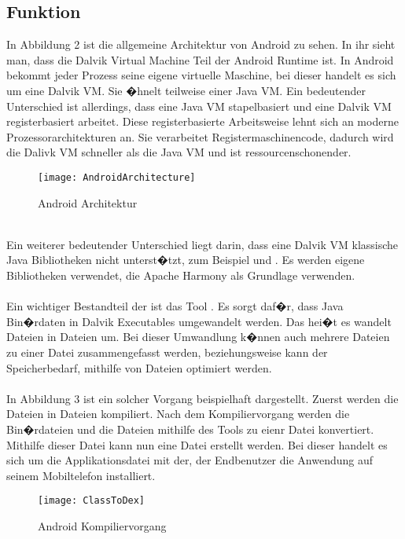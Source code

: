 \documentclass[11pt,conference,a4paper]{IEEEtran}
\begin{document}
\subsection{Funktion}
In Abbildung 2 ist die allgemeine Architektur von Android zu sehen. In ihr sieht man, dass die Dalvik Virtual Machine Teil der Android Runtime ist. In Android bekommt jeder Prozess seine eigene virtuelle Maschine, bei dieser handelt es sich um eine Dalvik VM. Sie �hnelt teilweise einer Java VM. Ein bedeutender Unterschied ist allerdings, dass eine Java VM stapelbasiert und eine Dalvik VM registerbasiert arbeitet. Diese registerbasierte Arbeitsweise lehnt sich an moderne Prozessorarchitekturen an. Sie verarbeitet Registermaschinencode, dadurch wird die Dalivk VM schneller als die Java VM und ist ressourcenschonender.
\\
\begin{figure*}
\centering
\texttt{[image: AndroidArchitecture]}
\caption{Android Architektur\cite{1}}
\label{fig:AndroidArchitecture}
\end{figure*}
\\
Ein weiterer bedeutender Unterschied liegt darin, dass eine Dalvik VM klassische Java Bibliotheken nicht unterst�tzt, zum Beispiel  und . Es werden eigene Bibliotheken verwendet, die Apache Harmony als Grundlage verwenden.
\\
\\
Ein wichtiger Bestandteil der  ist das Tool . Es sorgt daf�r, dass Java Bin�rdaten in Dalvik Executables umgewandelt werden. Das hei�t es wandelt  Dateien in  Dateien um. Bei dieser Umwandlung k�nnen auch mehrere  Dateien zu einer  Datei zusammengefasst werden, beziehungsweise kann der Speicherbedarf, mithilfe von  Dateien optimiert werden. 
\\
\\
In Abbildung 3 ist ein solcher Vorgang beispielhaft dargestellt. Zuerst werden die  Dateien in  Dateien kompiliert. Nach dem Kompiliervorgang werden die Bin�rdateien und die  Dateien mithilfe des  Tools zu eienr  Datei konvertiert. Mithilfe dieser Datei kann nun eine  Datei erstellt werden. Bei dieser handelt es sich um die Applikationsdatei mit der, der Endbenutzer die Anwendung auf seinem Mobiltelefon installiert.

\begin{figure*}
\centering
\texttt{[image: ClassToDex]}
\caption{Android Kompiliervorgang\cite{7}}
\label{fig:ClassToDex}
\end{figure*}
\end{document}
